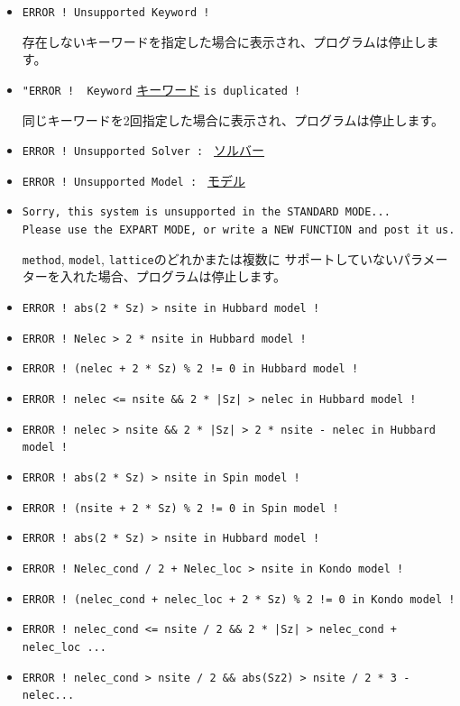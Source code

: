 \begin{itemize}
\item \verb|ERROR ! Unsupported Keyword !|

存在しないキーワードを指定した場合に表示され、プログラムは停止します。

\item \verb|"ERROR !  Keyword| \underline{キーワード} \verb|is duplicated !|

同じキーワードを2回指定した場合に表示され、プログラムは停止します。

\item \verb|ERROR ! Unsupported Solver : | \underline{ソルバー} \vspace{-0.3cm}
\item \verb|ERROR ! Unsupported Model : | \underline{モデル} \vspace{-0.3cm}
\item \verb|Sorry, this system is unsupported in the STANDARD MODE...| \\
  \verb|Please use the EXPART MODE, or write a NEW FUNCTION and post it us.|

\verb|method|, \verb|model|, \verb|lattice|のどれかまたは複数に
サポートしていないパラメーターを入れた場合、プログラムは停止します。

\item \verb#ERROR ! abs(2 * Sz) > nsite in Hubbard model !# \vspace{-0.3cm}
\item \verb#ERROR ! Nelec > 2 * nsite in Hubbard model !#\vspace{-0.3cm}
\item \verb#ERROR ! (nelec + 2 * Sz) % 2 != 0 in Hubbard model !#\vspace{-0.3cm}
\item \verb#ERROR ! nelec <= nsite && 2 * |Sz| > nelec in Hubbard model !#\vspace{-0.3cm}
\item \verb#ERROR ! nelec > nsite && 2 * |Sz| > 2 * nsite - nelec in Hubbard model !#\vspace{-0.3cm}
\item \verb#ERROR ! abs(2 * Sz) > nsite in Spin model !#\vspace{-0.3cm}
\item \verb#ERROR ! (nsite + 2 * Sz) % 2 != 0 in Spin model !#\vspace{-0.3cm}
\item \verb#ERROR ! abs(2 * Sz) > nsite in Hubbard model !#\vspace{-0.3cm}
\item \verb#ERROR ! Nelec_cond / 2 + Nelec_loc > nsite in Kondo model !#\vspace{-0.3cm}
\item \verb#ERROR ! (nelec_cond + nelec_loc + 2 * Sz) % 2 != 0 in Kondo model !#\vspace{-0.3cm}
\item \verb#ERROR ! nelec_cond <= nsite / 2 && 2 * |Sz| > nelec_cond + nelec_loc ...#\vspace{-0.3cm}
\item \verb#ERROR ! nelec_cond > nsite / 2 && abs(Sz2) > nsite / 2 * 3 - nelec...#


\end{itemize}
